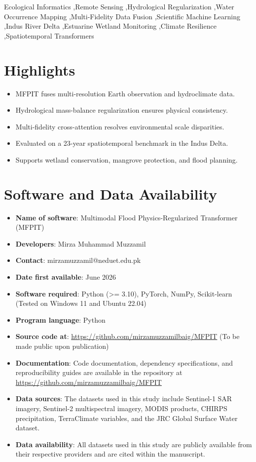\documentclass[preprint,12pt]{elsarticle}
\begin{document}
\begin{frontmatter}
\begin{keyword}
Ecological Informatics \sep Remote Sensing \sep Hydrological Regularization \sep Water Occurrence Mapping \sep Multi-Fidelity Data Fusion \sep Scientific Machine Learning \sep Indus River Delta \sep Estuarine Wetland Monitoring \sep Climate Resilience \sep Spatiotemporal Transformers
\end{keyword}

\end{frontmatter}

\section*{Highlights}
\begin{itemize}
    \item MFPIT fuses multi-resolution Earth observation and hydroclimate data.
    \item Hydrological mass-balance regularization ensures physical consistency.
    \item Multi-fidelity cross-attention resolves environmental scale disparities.
    \item Evaluated on a 23-year spatiotemporal benchmark in the Indus Delta.
    \item Supports wetland conservation, mangrove protection, and flood planning.
\end{itemize}

\section*{Software and Data Availability}
\begin{itemize}
    \item \textbf{Name of software}: Multimodal Flood Physics-Regularized Transformer (MFPIT)
    \item \textbf{Developers}: Mirza Muhammad Muzzamil
    \item \textbf{Contact}: mirzamuzzamil@neduet.edu.pk
    \item \textbf{Date first available}: June 2026
    \item \textbf{Software required}: Python (>= 3.10), PyTorch, NumPy, Scikit-learn (Tested on Windows 11 and Ubuntu 22.04)
    \item \textbf{Program language}: Python
    \item \textbf{Source code at}: \url{https://github.com/mirzamuzzamilbaig/MFPIT} (To be made public upon publication)
    \item \textbf{Documentation}: Code documentation, dependency specifications, and reproducibility guides are available in the repository at \url{https://github.com/mirzamuzzamilbaig/MFPIT}
    \item \textbf{Data sources}: The datasets used in this study include Sentinel-1 SAR imagery, Sentinel-2 multispectral imagery, MODIS products, CHIRPS precipitation, TerraClimate variables, and the JRC Global Surface Water dataset.
    \item \textbf{Data availability}: All datasets used in this study are publicly available from their respective providers and are cited within the manuscript.
\end{itemize}
\end{document}
